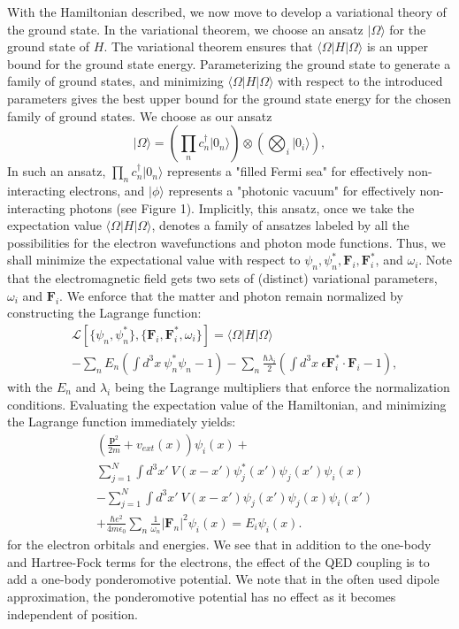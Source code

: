 \documentclass[aps,prl,twocolumn,
	groupedaddress,superscriptaddress,
	amsfonts,amssymb,amsmath,floatfix,
	citeautoscript]{revtex4-1}
\begin{document}
With the Hamiltonian described, we now move to develop a variational theory of the ground state. In the variational theorem, we choose an ansatz $|\Omega\rangle$ for the ground state of $H$. The variational theorem ensures that $\langle \Omega|H|\Omega\rangle$ is an upper bound for the ground state energy. Parameterizing the ground state to generate a family of ground states, and minimizing $\langle \Omega|H|\Omega\rangle$ with respect to the introduced parameters gives the best upper bound for the ground state energy for the chosen family of ground states.  We choose as our ansatz
\begin{equation}
|\Omega\rangle = \left( \prod\limits_n c_n^{\dagger}|0_n\rangle\right) \otimes \left(\bigotimes_i|0_i\rangle\right),
\end{equation}
In such an ansatz, $\prod\limits_n c_n^{\dagger}|0_n\rangle$ represents a "filled Fermi sea" for effectively non-interacting electrons, and $|\phi\rangle$ represents a "photonic vacuum" for effectively non-interacting photons (see Figure 1). Implicitly, this ansatz, once we take the expectation value $\langle \Omega|H|\Omega\rangle$, denotes a family of ansatzes labeled by all the possibilities for the electron wavefunctions and photon mode functions. Thus, we shall minimize the expectational value with respect to $\psi_n, \psi_n^*, \mathbf{F}_i, \mathbf{F}_i^*$, and $\omega_i$. Note that the electromagnetic field gets two sets of (distinct) variational parameters, $\omega_i$ and $\mathbf{F}_i$. We enforce that the matter and photon remain normalized by constructing the Lagrange function:
\begin{align}
&\mathcal{L}[\{ \psi_n,\psi_n^* \},\{ \mathbf{F}_i,\mathbf{F}_i^*,\omega_i \}] = \langle \Omega |H|\Omega\rangle \\
&- \sum_n E_n\left(\int d^3x ~\psi_n^*\psi_n - 1 \right) - \sum_n \frac{\hbar\lambda_i}{2}\left(\int d^3x ~\epsilon\mathbf{F}_i^*\cdot\mathbf{F}_i - 1 \right),\nonumber
\end{align}
with the $E_n$ and $\lambda_i$ being the Lagrange multipliers that enforce the normalization conditions. Evaluating the expectation value of the Hamiltonian, and minimizing the Lagrange function  immediately yields:
\begin{align}
&\left(\frac{\mathbf{p}^2}{2m}+v_{ext}(x) \right)\psi_i(x) + \nonumber \\ &\sum\limits_{j=1}^N \int d^3x' ~ V(x-x')\psi^*_j(x')\psi_j(x')\psi_i(x) \nonumber \\ & - \sum\limits_{j=1}^N \int d^3x' ~ V(x-x')\psi_j(x')\psi_j(x)\psi_i(x')  \nonumber \\ &+ \frac{\hbar e^2}{4m\epsilon_0}\sum_n \frac{1}{\omega_n}|\mathbf{F}_n|^2\psi_i(x)   = E_i\psi_i(x).
\end{align}
for the electron orbitals and energies. We see that in addition to the one-body and Hartree-Fock terms for the electrons, the effect of the QED coupling is to add a one-body ponderomotive potential. We note that in the often used dipole approximation, the ponderomotive potential has no effect as it becomes independent of position.
\end{document}
